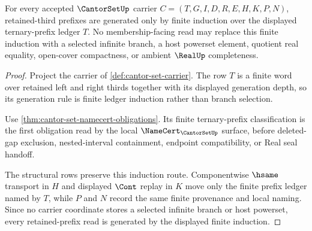 \begin{theorem}
\label{thm:cantor-set-finite-prefix-induction}
For every accepted $\CantorSetUp$ carrier $C=(T,G,I,D,R,E,H,K,P,N)$, retained-third prefixes are generated only by finite induction over the displayed ternary-prefix ledger $T$. No membership-facing read may replace this finite induction with a selected infinite branch, a host powerset element, quotient real equality, open-cover compactness, or ambient $\RealUp$ completeness.
\end{theorem}
\begin{proof}
Project the carrier of \autoref{def:cantor-set-carrier}. The row $T$ is a finite word over retained left and right thirds together with its displayed generation depth, so its generation rule is finite ledger induction rather than branch selection.

Use \autoref{thm:cantor-set-namecert-obligations}. Its finite ternary-prefix classification is the first obligation read by the local $\NameCert_{\CantorSetUp}$ surface, before deleted-gap exclusion, nested-interval containment, endpoint compatibility, or Real seal handoff.

The structural rows preserve this induction route. Componentwise $\hsame$ transport in $H$ and displayed $\Cont$ replay in $K$ move only the finite prefix ledger named by $T$, while $P$ and $N$ record the same finite provenance and local naming. Since no carrier coordinate stores a selected infinite branch or host powerset, every retained-prefix read is generated by the displayed finite induction.
\end{proof}

